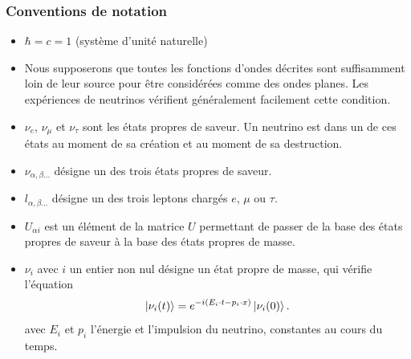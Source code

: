             \subsubsection{Conventions de notation}
            \begin{itemize}
                \item $\hbar = c = 1$ (système d'unité naturelle)
                \item Nous supposerons que toutes les fonctions d'ondes décrites sont suffisamment loin de leur source pour être considérées comme des ondes planes. Les expériences de neutrinos vérifient généralement facilement cette condition.
                \item $\nu_e$, $\nu_{\mu}$ et $\nu_{\tau}$ sont les états propres de saveur. Un neutrino est dans un de ces états au moment de sa création et au moment de sa destruction.
                \item $\nu_{\alpha,\beta...}$ désigne un des trois états propres de saveur.
                \item $l_{\alpha,\beta...}$ désigne un des trois leptons chargés $e$, $\mu$ ou $\tau$.
                \item $U_{\alpha i}$ est un élément de la matrice $U$ permettant de passer de la base des états propres de saveur à la base des états propres de masse.
                \item $\nu_{i}$ avec $i$ un entier non nul désigne un état propre de masse, qui vérifie l'équation
                \begin{equation}
                    \ket{\nu_i(t)} = e^{-i(E_i\cdot t - p_i\cdot x)}\ket{\nu_i(0)}.
                \end{equation}
                avec $E_i$ et $p_i$ l'énergie et l'impulsion du neutrino, constantes au cours du temps.
            \end{itemize}
            
